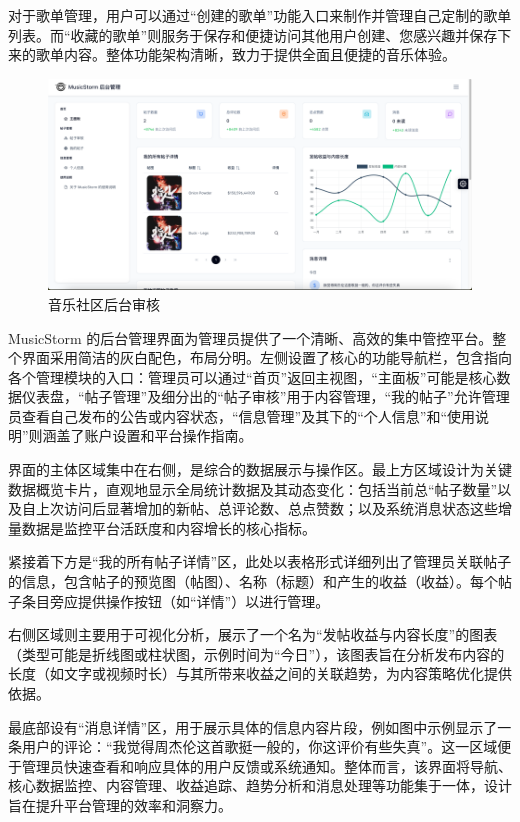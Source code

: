 \documentclass{base}
\numberwithin{figure}{section} %
\begin{document}
对于歌单管理，用户可以通过“创建的歌单”功能入口来制作并管理自己定制的歌单列表。而“收藏的歌单”则服务于保存和便捷访问其他用户创建、您感兴趣并保存下来的歌单内容。整体功能架构清晰，致力于提供全面且便捷的音乐体验。

\begin{figure}[H]
    \centering
    \includegraphics[width=\textwidth]{images/4-5.png}
    \caption{音乐社区后台审核}
\end{figure}

MusicStorm 的后台管理界面为管理员提供了一个清晰、高效的集中管控平台。整个界面采用简洁的灰白配色，布局分明。左侧设置了核心的功能导航栏，包含指向各个管理模块的入口：管理员可以通过“首页”返回主视图，“主面板”可能是核心数据仪表盘，“帖子管理”及细分出的“帖子审核”用于内容管理，“我的帖子”允许管理员查看自己发布的公告或内容状态，“信息管理”及其下的“个人信息”和“使用说明”则涵盖了账户设置和平台操作指南。

界面的主体区域集中在右侧，是综合的数据展示与操作区。最上方区域设计为关键数据概览卡片，直观地显示全局统计数据及其动态变化：包括当前总“帖子数量”以及自上次访问后显著增加的新帖、总评论数、总点赞数；以及系统消息状态这些增量数据是监控平台活跃度和内容增长的核心指标。

紧接着下方是“我的所有帖子详情”区，此处以表格形式详细列出了管理员关联帖子的信息，包含帖子的预览图（帖图）、名称（标题）和产生的收益（收益）。每个帖子条目旁应提供操作按钮（如“详情”）以进行管理。

​​右侧区域则主要用于可视化分析​​，展示了一个名为“发帖收益与内容长度”的图表（类型可能是折线图或柱状图，示例时间为“今日”），该图表旨在分析发布内容的长度（如文字或视频时长）与其所带来收益之间的关联趋势，为内容策略优化提供依据。

​​最底部设有“消息详情”区​​，用于展示具体的信息内容片段，例如图中示例显示了一条用户的评论：“我觉得周杰伦这首歌挺一般的，你这评价有些失真”。这一区域便于管理员快速查看和响应具体的用户反馈或系统通知。整体而言，该界面将导航、核心数据监控、内容管理、收益追踪、趋势分析和消息处理等功能集于一体，设计旨在提升平台管理的效率和洞察力。
\newpage
\end{document}
